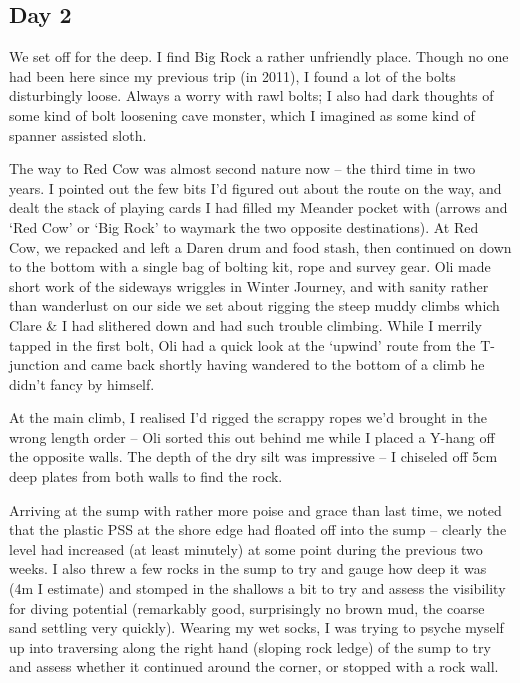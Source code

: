\subsection{Day 2}\label{day-2}

We set off for the deep. I find Big Rock a rather unfriendly place.
Though no one had been here since my previous trip (in 2011), I found a
lot of the bolts disturbingly loose. Always a worry with rawl bolts; I
also had dark thoughts of some kind of bolt loosening cave monster,
which I imagined as some kind of spanner assisted sloth.

The way to Red Cow was almost second nature now -- the third time in two
years. I pointed out the few bits I'd figured out about the route on the
way, and dealt the stack of playing cards I had filled my Meander pocket
with (arrows and `Red Cow' or `Big Rock' to waymark the two opposite
destinations). At Red Cow, we repacked and left a Daren drum and food
stash, then continued on down to the bottom with a single bag of bolting
kit, rope and survey gear. Oli made short work of the sideways wriggles
in Winter Journey, and with sanity rather than wanderlust on our side we
set about rigging the steep muddy climbs which Clare \& I had slithered
down and had such trouble climbing. While I merrily tapped in the first
bolt, Oli had a quick look at the `upwind' route from the T-junction and
came back shortly having wandered to the bottom of a climb he didn't
fancy by himself.

At the main climb, I realised I'd rigged the scrappy ropes we'd brought
in the wrong length order -- Oli sorted this out behind me while I
placed a Y-hang off the opposite walls. The depth of the dry silt was
impressive -- I chiseled off 5cm deep plates from both walls to find the
rock.

Arriving at the sump with rather more poise and grace than last time, we
noted that the plastic PSS at the shore edge had floated off into the
sump -- clearly the level had increased (at least minutely) at some
point during the previous two weeks. I also threw a few rocks in the
sump to try and gauge how deep it was (4m I estimate) and stomped in the
shallows a bit to try and assess the visibility for diving potential
(remarkably good, surprisingly no brown mud, the coarse sand settling
very quickly). Wearing my wet socks, I was trying to psyche myself up
into traversing along the right hand (sloping rock ledge) of the sump to
try and assess whether it continued around the corner, or stopped with a
rock wall.

